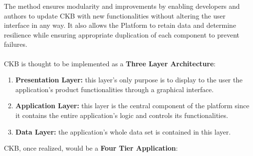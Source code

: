 The method ensures modularity and improvements by enabling developers and authors to update CKB with new functionalities without altering the user interface in any way. It also allows the Platform to retain data and determine 
resilience while ensuring appropriate duplication of each component to prevent failures.\\
\\
CKB is thought to be implemented as a \textbf{Three Layer Architecture}:
\begin{enumerate}[label=$\bullet$]
    \item \textbf{Presentation Layer:} this layer's only purpose is to display to the user the application's product functionalities through a graphical interface.
    \item \textbf{Application Layer:} this layer is the central component of the platform since it contains the entire application's logic and controls its functionalities.
    \item \textbf{Data Layer:} the application's whole data set is contained in this layer.
\end{enumerate}
CKB, once realized, would be a \textbf{Four Tier Application}:
